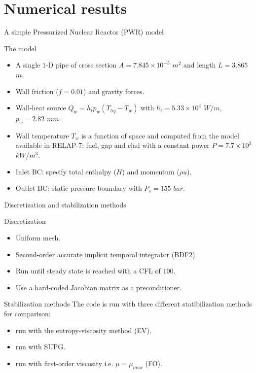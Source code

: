 \documentclass[xcolor=dvipsnames,10pt]{beamer}
\begin{document}
\section{Numerical results}
\begin{frame}{A simple Pressurized Nuclear Reactor (PWR) model}
\begin{block}{The model}
\begin{itemize}
\setlength{\itemsep}{10pt}
\item A single $1$-D pipe of cross section $A=7.845 \times 10^{-5}$ $m^2$ and length $L = 3.865$ $m$.
\item Wall friction ($f=0.01$) and gravity forces.
\item Wall-heat source $Q_w = h_t p_w (T_{liq} - T_w)$ with $h_t = 5.33 \times 10^4$ $W/m$, $p_w = 2.82$ $mm$.
\item Wall temperature $T_w$ is a function of space and computed from the model available in RELAP-7: fuel, gap and clad with a constant power $P = 7.7 \times 10^3$ $kW / m^3$.
\item Inlet BC: specify total enthalpy ($H$) and momentum ($\rho u$).
\item Outlet BC: static pressure boundary with $P_s = 155$ $bar$.
\end{itemize}
\end{block}
\end{frame}
\begin{frame}{Discretization and stabilization methods}
\begin{block}{Discretization}
\begin{itemize}
\item Uniform mesh.
\item Second-order accurate implicit temporal integrator (BDF2).
\item Run until steady state is reached with a CFL of $100$.
\item Use a hard-coded Jacobian matrix as a preconditioner.
\end{itemize}
\end{block}
\begin{block}{Stabilization methods}
The code is run with three different statibilization methods for comparison:
\begin{itemize}
\item run with the entropy-viscosity method (EV).
\item run with SUPG.
\item run with first-order viscosity i.e. $\mu = \mu_{max}$ (FO).
\end{itemize}
\end{block}
\end{frame}
\end{document}
